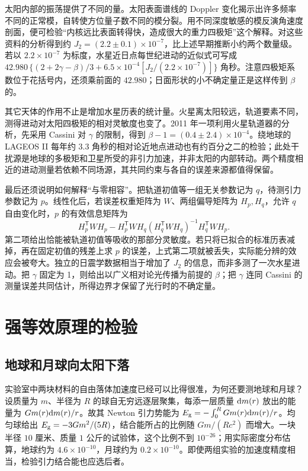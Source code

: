 太阳内部的振荡提供了不同的量。太阳表面谱线的 Doppler 变化揭示出许多频率不同的正常模，自转使方位量子数不同的模分裂。用不同深度敏感的模反演角速度剖面，便可检验“内核远比表面转得快，造成很大的重力四极矩”这个解释。对这些资料的分析得到约 $J_2=(2.2\pm0.1)\times10^{-7}$，比上述早期推断小约两个数量级。若以 $2.2\times10^{-7}$ 为标度，水星近日点每世纪进动的近似式可写成 $42.980\,\{(2+2\gamma-\beta)/3 +6.5\times10^{-4} [J_2/(2.2\times10^{-7})]\}$ 角秒。注意四极矩系数位于花括号内，还须乘前面的 $42.980$；日面形状的小不确定量正是这样传到 $\beta$ 的。

其它天体的作用不止是增加水星历表的统计量。火星离太阳较远，轨道要素不同，测得进动对太阳四极矩的相对灵敏度也变了。2011 年一项利用火星轨道器的分析，先采用 Cassini 对 $\gamma$ 的限制，得到 $\beta-1=(0.4\pm2.4)\times10^{-4}$。绕地球的 LAGEOS II 每年约 $3.3$ 角秒的相对论近地点进动也有约百分之二的检验；此处干扰源是地球的多极矩和卫星所受的非引力加速，并非太阳的内部转动。两个精度相近的进动测量若依赖不同场源，其共同约束与各自的误差来源都值得保留。

最后还须说明如何解释“与零相容”。把轨道初值等一组无关参数记为 $q$，待测引力参数记为 $p$。线性化后，若误差权重矩阵为 $W$、两组偏导矩阵为 $H_p,H_q$，允许 $q$ 自由变化时，$p$ 的有效信息矩阵为
\[
 H_p^{\mathsf T}WH_p-
 H_p^{\mathsf T}WH_q(H_q^{\mathsf T}WH_q)^{-1}H_q^{\mathsf T}WH_p .
\]
第二项给出恰能被轨道初值等吸收的那部分灵敏度。若只将已拟合的标准历表减掉，再在固定初值的残差上求 $p$ 的误差，上式第二项就被丢失，实际能分辨的效应会被夸大。独立的日震学数据相当于增加了 $J_2$ 的信息，而非多测了一次水星进动。把 $\gamma$ 固定为 1，则给出以广义相对论光传播为前提的 $\beta$；把 $\gamma$ 连同 Cassini 的测量误差共同估计，所得边界才保留了光行时的不确定量。

\section{强等效原理的检验}

\subsection{地球和月球向太阳下落}\label{sec:pn-sep}

实验室中两块材料的自由落体加速度已经可以比得很准，为何还要测地球和月球？设质量为 $m$、半径为 $R$ 的球自无穷远逐层聚集，每添一层质量 $\dd m(r)$ 放出的能量为 $Gm(r)\dd m(r)/r$。故其 Newton 引力势能为 $E_{\rm g}=-\int_0^R Gm(r)\dd m(r)/r$。均匀球给出 $E_{\rm g}=-3Gm^2/(5R)$，结合能所占的比例随 $Gm/(Rc^2)$ 而增大。一块半径 $10$ 厘米、质量 $1$ 公斤的试验体，这个比例不到 $10^{-26}$；用实际密度分布估算，地球约为 $4.6\times10^{-10}$，月球约为 $0.2\times10^{-10}$。即使两组实验的加速度精度相当，检验引力结合能也应选后者。

